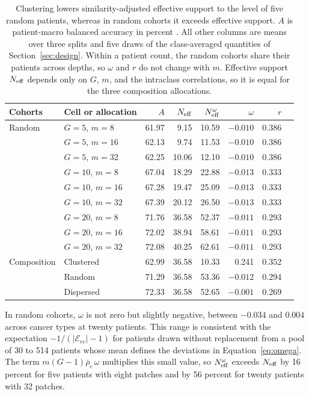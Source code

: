 \begin{table}[htbp]
\centering
\small
\renewcommand{\arraystretch}{1.15}
\begin{tabular}{@{}llrrrrrr@{}}
\toprule
Cohorts & Cell or allocation & $A$ & $N_{\mathrm{eff}}$ & $N_{\mathrm{eff}}^{\omega}$ & $\omega$ & $r$ \\
\midrule
Random & $G=5$, $m=8$ & 61.97 & 9.15 & 10.59 & $-0.010$ & 0.386 \\
 & $G=5$, $m=16$ & 62.13 & 9.74 & 11.53 & $-0.010$ & 0.386 \\
 & $G=5$, $m=32$ & 62.25 & 10.06 & 12.10 & $-0.010$ & 0.386 \\
\addlinespace
 & $G=10$, $m=8$ & 67.04 & 18.29 & 22.88 & $-0.013$ & 0.333 \\
 & $G=10$, $m=16$ & 67.28 & 19.47 & 25.09 & $-0.013$ & 0.333 \\
 & $G=10$, $m=32$ & 67.39 & 20.12 & 26.50 & $-0.013$ & 0.333 \\
\addlinespace
 & $G=20$, $m=8$ & 71.76 & 36.58 & 52.37 & $-0.011$ & 0.293 \\
 & $G=20$, $m=16$ & 72.02 & 38.94 & 58.61 & $-0.011$ & 0.293 \\
 & $G=20$, $m=32$ & 72.08 & 40.25 & 62.61 & $-0.011$ & 0.293 \\
\midrule
Composition & Clustered & 62.99 & 36.58 & 10.33 & 0.241 & 0.352 \\
 & Random & 71.29 & 36.58 & 53.36 & $-0.012$ & 0.294 \\
 & Dispersed & 72.33 & 36.58 & 52.65 & $-0.001$ & 0.269 \\
\bottomrule
\end{tabular}
\caption{Clustering lowers similarity-adjusted effective support to the level of five random patients, whereas in random cohorts it exceeds effective support. $A$ is patient-macro balanced accuracy in percent \citep{queisler2026effectiveSupport,queisler2026cohortComposition}. All other columns are means over three splits and five draws of the class-averaged quantities of Section~\ref{sec:design}. Within a patient count, the random cohorts share their patients across depths, so $\omega$ and $r$ do not change with $m$. Effective support $N_{\mathrm{eff}}$ depends only on $G$, $m$, and the intraclass correlations, so it is equal for the three composition allocations.}
\label{tab:cohort-quantities}
\end{table}

\noindent In random cohorts, $\omega$ is not zero but slightly negative, between $-0.034$ and $0.004$ across cancer types at twenty patients. This range is consistent with the expectation $-1/(|\mathcal E_{rc}|-1)$ for patients drawn without replacement from a pool of 30 to 514 patients whose mean defines the deviations in Equation~\eqref{eq:omega}. The term $m(G-1)\bar\rho_c\,\omega$ multiplies this small value, so $N_{\mathrm{eff}}^{\omega}$ exceeds $N_{\mathrm{eff}}$ by 16 percent for five patients with eight patches and by 56 percent for twenty patients with 32 patches.

